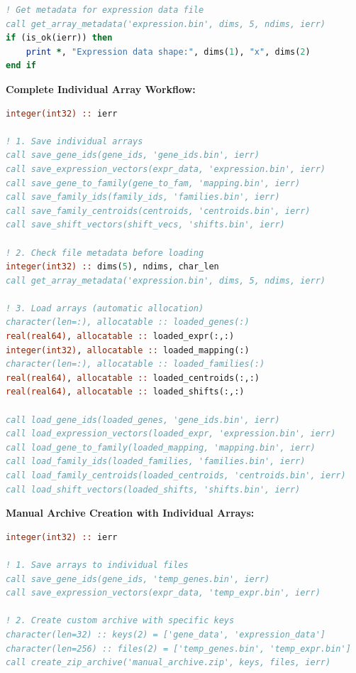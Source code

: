 \begin{enumerate}
\begin{itemize}
\begin{lstlisting}[language=Fortran, caption={Inspect Array File Metadata}]
! Get metadata for expression data file
call get_array_metadata('expression.bin', dims, 5, ndims, ierr)
if (is_ok(ierr)) then
    print *, "Expression data shape:", dims(1), "x", dims(2)
end if
                  \end{lstlisting}
                  
                  \textbf{Complete Individual Array Workflow:}
                  \begin{lstlisting}[language=Fortran, caption={Individual Array Save/Load Workflow}]
integer(int32) :: ierr

! 1. Save individual arrays
call save_gene_ids(gene_ids, 'gene_ids.bin', ierr)
call save_expression_vectors(expr_data, 'expression.bin', ierr)
call save_gene_to_family(gene_to_fam, 'mapping.bin', ierr)
call save_family_ids(family_ids, 'families.bin', ierr)
call save_family_centroids(centroids, 'centroids.bin', ierr)
call save_shift_vectors(shift_vecs, 'shifts.bin', ierr)

! 2. Check file metadata before loading
integer(int32) :: dims(5), ndims, char_len
call get_array_metadata('expression.bin', dims, 5, ndims, ierr)

! 3. Load arrays (automatic allocation)
character(len=:), allocatable :: loaded_genes(:)
real(real64), allocatable :: loaded_expr(:,:)
integer(int32), allocatable :: loaded_mapping(:)
character(len=:), allocatable :: loaded_families(:)
real(real64), allocatable :: loaded_centroids(:,:)
real(real64), allocatable :: loaded_shifts(:,:)

call load_gene_ids(loaded_genes, 'gene_ids.bin', ierr)
call load_expression_vectors(loaded_expr, 'expression.bin', ierr)
call load_gene_to_family(loaded_mapping, 'mapping.bin', ierr)
call load_family_ids(loaded_families, 'families.bin', ierr)
call load_family_centroids(loaded_centroids, 'centroids.bin', ierr)
call load_shift_vectors(loaded_shifts, 'shifts.bin', ierr)
                  \end{lstlisting}
                  
                  \textbf{Manual Archive Creation with Individual Arrays:}
                  \begin{lstlisting}[language=Fortran, caption={Manual Archive Creation}]
integer(int32) :: ierr

! 1. Save arrays to individual files
call save_gene_ids(gene_ids, 'temp_genes.bin', ierr)
call save_expression_vectors(expr_data, 'temp_expr.bin', ierr)

! 2. Create custom archive with specific keys
character(len=32) :: keys(2) = ['gene_data', 'expression_data']
character(len=256) :: files(2) = ['temp_genes.bin', 'temp_expr.bin']
call create_zip_archive('manual_archive.zip', keys, files, ierr)


\end{lstlisting}
\end{itemize}
\end{enumerate}
